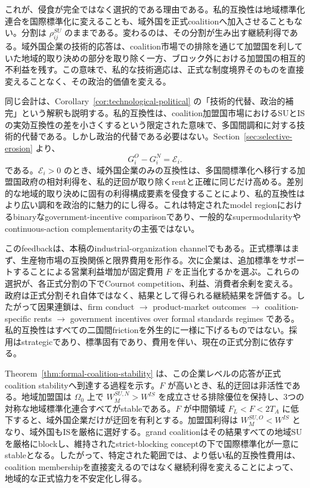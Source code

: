 これが、侵食が完全ではなく選択的である理由である。私的互換性は地域標準化連合を国際標準化に変えることも、域外国を正式coalitionへ加入させることもない。分割は $\rho_{ij}^{SU}$ のままである。変わるのは、その分割が生み出す継続利得である。域外国企業の技術的応答は、coalition市場での排除を通じて加盟国を利していた地域的取り決めの部分を取り除く一方、ブロック外における加盟国の相互的不利益を残す。この意味で、私的な技術適応は、正式な制度境界そのものを直接変えることなく、その政治的価値を変える。

同じ会計は、Corollary~\ref{cor:technological-political} の「技術的代替、政治的補完」という解釈も説明する。私的互換性は、coalition加盟国市場におけるSUとISの実効互換性の差を小さくするという限定された意味で、多国間調和に対する技術的代替である。しかし政治的代替である必要はない。Section~\ref{sec:selective-erosion} より、
\[
    G_i^O-G_i^N=\mathscr E_i.
\]
である。$\mathscr E_i>0$ のとき、域外国企業のみの互換性は、多国間標準化へ移行する加盟国政府の相対利得を、私的迂回が取り除くrentと正確に同じだけ高める。差別的な地域的取り決めに固有の利得構成要素を侵食することにより、私的互換性はより広い調和を政治的に魅力的にし得る。これは特定されたmodel regionにおけるbinaryなgovernment-incentive comparisonであり、一般的なsupermodularityやcontinuous-action complementarityの主張ではない。

このfeedbackは、本稿のindustrial-organization channelでもある。正式標準はまず、生産物市場の互換関係と限界費用を形作る。次に企業は、追加標準をサポートすることによる営業利益増加が固定費用 $F$ を正当化するかを選ぶ。これらの選択が、各正式分割の下でCournot competition、利益、消費者余剰を変える。政府は正式分割それ自体ではなく、結果として得られる継続結果を評価する。したがって因果連鎖は、firm conduct $\rightarrow$ product-market outcomes $\rightarrow$ coalition-specific rents $\rightarrow$ government incentives over formal standards regimes である。私的互換性はすべての二国間frictionを外生的に一様に下げるものではない。採用はstrategicであり、標準固有であり、費用を伴い、現在の正式分割に依存する。

Theorem~\ref{thm:formal-coalition-stability} は、この企業レベルの応答が正式coalition stabilityへ到達する過程を示す。$F$ が高いとき、私的迂回は非活性である。地域加盟国は $\Omega_0$ 上で $W_M^{SU,N}>W^{IS}$ を成立させる排除優位を保持し、3つの対称な地域標準化連合すべてがstableである。$F$ が中間領域 $F_L<F<2T_A$ に低下すると、域外国企業だけが迂回を有利とする。加盟国利得は $W_M^{SU,O}<W^{IS}$ となり、域外国もISを厳格に選好する。grand coalitionはその結果すべての地域SUを厳格にblockし、維持されたstrict-blocking conceptの下で国際標準化が一意にstableとなる。したがって、特定された範囲では、より低い私的互換性費用は、coalition membershipを直接変えるのではなく継続利得を変えることによって、地域的な正式協力を不安定化し得る。

